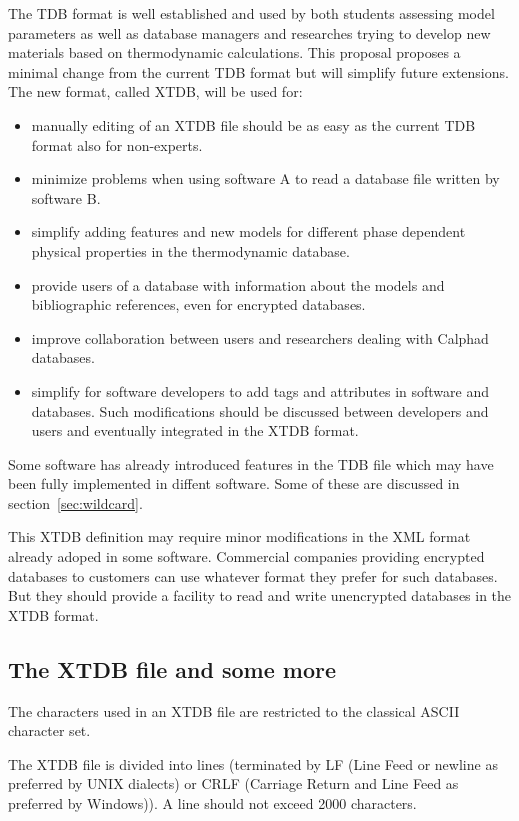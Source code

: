 \documentclass{article}
\begin{document}
The TDB format is well established and used by both students assessing
model parameters as well as database managers and researches trying to
develop new materials based on thermodynamic calculations.  This
proposal proposes a minimal change from the current TDB format but
will simplify future extensions.  The new format, called XTDB, will be
used for:
\begin{itemize}
  \item manually editing of an XTDB file should be as easy as the
    current TDB format also for non-experts.
  \item minimize problems when using software A to read a database
    file written by software B.
  \item simplify adding features and new models for different phase
    dependent physical properties in the thermodynamic database.
  \item provide users of a database with information about the models
    and bibliographic references, even for encrypted databases.
  \item improve collaboration between users and researchers dealing
    with Calphad databases.
  \item simplify for software developers to add tags and attributes in
    software and databases.  Such modifications should be discussed
    between developers and users and eventually integrated in the XTDB
    format.
\end{itemize}

Some software has already introduced features in the TDB file which
may have been fully implemented in diffent software.  Some of these
are discussed in section~\ref{sec:wildcard}.

This XTDB definition may require minor modifications in the XML format
already adoped in some software.  Commercial companies providing
encrypted databases to customers can use whatever format they prefer
for such databases.  But they should provide a facility to read and
write unencrypted databases in the XTDB format.

\subsection{The XTDB file and some more}

The characters used in an XTDB file are restricted to the classical
ASCII character set.

The XTDB file is divided into lines (terminated by LF (Line Feed or
newline as preferred by UNIX dialects) or CRLF (Carriage Return and
Line Feed as preferred by Windows)).  A line should not exceed 2000
characters.
\end{document}
